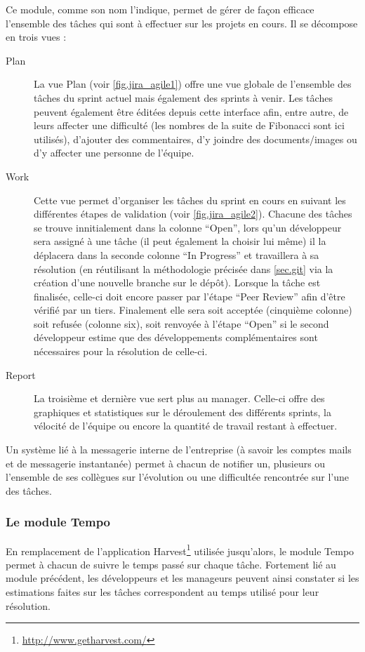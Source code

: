 \documentclass[12pt,a4paper]{book}
\begin{document}
Ce module, comme son nom l'indique, permet de gérer de façon efficace l'ensemble des tâches qui sont à effectuer sur les projets en cours. Il se décompose en trois vues :

\begin{description}
  \item[Plan] La vue Plan (voir \cref{fig.jira_agile1}) offre une vue globale de l'ensemble des tâches du sprint actuel mais également des sprints à venir. Les tâches peuvent également être éditées depuis cette interface afin, entre autre, de leurs affecter une difficulté (les nombres de la suite de Fibonacci sont ici utilisés), d'ajouter des commentaires, d'y joindre des documents/images ou d'y affecter une personne de l'équipe.
  \item[Work] Cette vue permet d'organiser les tâches du sprint en cours en suivant les différentes étapes de validation (voir \cref{fig.jira_agile2}). Chacune des tâches se trouve innitialement dans la colonne ``Open'', lors qu'un développeur sera assigné à une tâche (il peut également la choisir lui même) il la déplacera dans la seconde colonne ``In Progress'' et travaillera à sa résolution (en réutilisant la méthodologie précisée dans \cref{sec.git} via la création d'une nouvelle branche sur le dépôt). Lorsque la tâche est finalisée, celle-ci doit encore passer par l'étape ``Peer Review'' afin d'être vérifié par un tiers. Finalement elle sera soit acceptée (cinquième colonne) soit refusée (colonne six), soit renvoyée à l'étape ``Open'' si le second développeur estime que des développements complémentaires sont nécessaires pour la résolution de celle-ci.
  \item[Report] La troisième et dernière vue sert plus au manager. Celle-ci offre des graphiques et statistiques sur le déroulement des différents sprints, la vélocité de l'équipe ou encore la quantité de travail restant à effectuer.
\end{description}

Un système lié à la messagerie interne de l'entreprise (à savoir les comptes mails et de messagerie instantanée) permet à chacun de notifier un, plusieurs ou l'ensemble de ses collègues sur l'évolution ou une difficultée rencontrée sur l'une des tâches.

\subsubsection{Le module Tempo}

En remplacement de l'application Harvest\footnote{\url{http://www.getharvest.com/}} utilisée jusqu'alors, le module Tempo permet à chacun de suivre le temps passé sur chaque tâche. Fortement lié au module précédent, les développeurs et les manageurs peuvent ainsi constater si les estimations faites sur les tâches correspondent au temps utilisé pour leur résolution.
\end{document}
